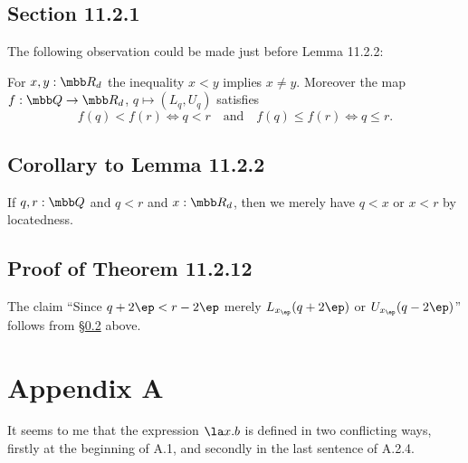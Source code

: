 \documentclass[12pt]{article}
\begin{document}

\subsection{Section 11.2.1}

The following observation could be made just before Lemma 11.2.2: 

For $x,y:\mbb R_d$ the inequality $x<y$ implies $x\neq y$. Moreover the map $f:\mbb Q\to\mbb R_d$, $q\mapsto(L_q,U_q)$ satisfies
$$
f(q)<f(r)\iff q<r\quad\text{and}\quad f(q)\le f(r)\iff q\le r.
$$ 


\subsection{Corollary to Lemma 11.2.2}\label{1122}

If $q,r:\mbb Q$ and $q<r$ and $x:\mbb R_d$, then we merely have $q<x$ or $x<r$ by locatedness.

\subsection{Proof of Theorem 11.2.12}

The claim ``Since $q+2\ep<r-2\ep$ merely $L_{x_\ep}(q+2\ep)$ or $U_{x_\ep}(q-2\ep)$'' follows from \S\ref{1122} above.


\section{Appendix A}

It seems to me that the expression $\la x.b$ is defined in two conflicting ways, firstly at the beginning of A.1, and secondly in the last sentence of A.2.4. 
\end{document}
